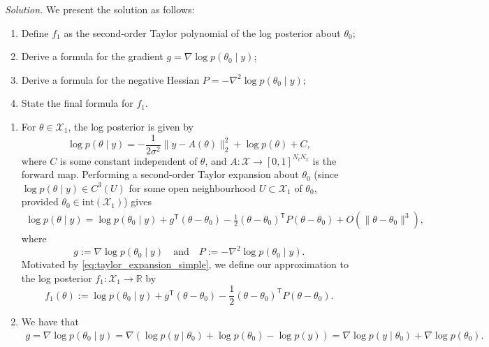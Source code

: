 \documentclass{homework}
\newcommand*{\R}{\mathbb R}
\newcommand{\norm}[1]{\|  #1 \|}
\begin{document}
\textit{Solution.} 
We present the solution as follows:
\begin{enumerate}
    \item Define $f_1$ as the second-order Taylor polynomial of the log posterior about $\theta_0$;
    \item Derive a formula for the gradient $g=\nabla\log p(\theta_0\mid y)$;
    \item Derive a formula for the negative Hessian $P=-\nabla^2\log p(\theta_0\mid y)$;
    \item State the final formula for $f_1$.
\end{enumerate}
\begin{enumerate}
    \item 
    For $\theta \in \mathcal{X}_1$, the log posterior is given by 
    \[
    \log p(\theta\mid y)
    =
    -\frac{1}{2\sigma^2}\lVert y-A(\theta)\rVert_2^2
    +\log p(\theta) + C,
    \]
    where $C$ is some constant independent of $\theta$, 
    and $A: \mathcal{X} \to [0, 1]^{N_t N_x}$ is the forward map.
    Performing a second-order Taylor expansion about $\theta_0$ 
    (since $\log p(\theta\mid y) \in C^3(U)$ for some open neighbourhood $U\subset\mathcal{X}_1$ of $\theta_0$, provided $\theta_0\in\text{int}(\mathcal{X}_1)$) gives
    \begin{align}
    \log p(\theta\mid y)
    = 
    \log p(\theta_0\mid y)
    +g^{\mathsf T}\left(\theta-\theta_0\right)
    -\frac12\left(\theta-\theta_0\right)^{\mathsf T}P\left(\theta-\theta_0\right)
    + O(\norm{\theta-\theta_0}^3), \label{eq:taylor_expansion_simple}
    \end{align}
    where
    \[
    g:=\nabla\log p(\theta_0\mid y) \quad \text{and} \quad P:=-\nabla^2\log p(\theta_0\mid y).
    \]
    Motivated by \eqref{eq:taylor_expansion_simple}, we define our approximation to the log posterior $f_1: \mathcal{X}_1 \to \R$ by
    \[
    f_1(\theta) := \log p(\theta_0\mid y)
    +g^{\mathsf T}\left(\theta-\theta_0\right)
    -\frac12\left(\theta-\theta_0\right)^{\mathsf T}P\left(\theta-\theta_0\right).
    \]

    \item We have that
    \begin{align}
    g 
    = \nabla\log p(\theta_0\mid y)
    = \nabla\left( \log p(y\mid\theta_0) + \log p(\theta_0) - \log p(y) \right)
    =
    \nabla\log p(y\mid\theta_0)
    +
    \nabla\log p(\theta_0). \label{eq:gradient_log_posterior}
    \end{align}


\end{enumerate}
\end{document}
